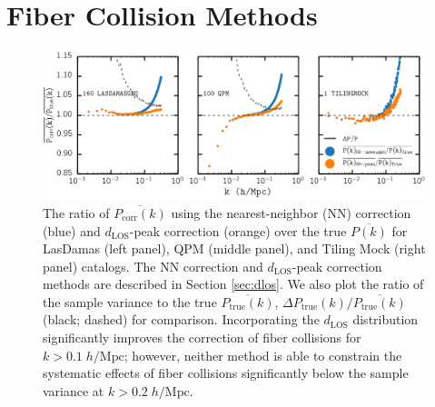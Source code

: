 \documentclass{emulateapj}
\begin{document}
\section{Fiber Collision Methods} \label{sec:fc_corr}
\begin{figure}
\begin{center}
\includegraphics[scale=0.55]{fcpaper_pk_peakonly_comp.png} 
\caption{The ratio of $\overline{P_\mathrm{corr} (k)}$ using the nearest-neighbor (NN) correction (blue) and $d_\mathrm{LOS}$-peak correction (orange) over the true $\overline{P(k)}$ for LasDamas (left panel), QPM (middle panel), and Tiling Mock (right panel) catalogs. The NN correction and $d_\mathrm{LOS}$-peak correction methods are described in Section \ref{sec:dlos}. We also plot the ratio of the sample variance to the true $\overline{P_\mathrm{true}(k)}$, $\Delta P_\mathrm{true}(k) / \overline{P_\mathrm{true}(k)}$ (black; dashed) for comparison. Incorporating the $d_{\mathrm{LOS}}$ distribution significantly improves the correction of fiber collisions for $k > 0.1 \; h/\mathrm{Mpc}$; however, neither method is able to constrain the systematic effects of fiber collisions significantly below the sample variance at $k > 0.2 \; h/\mathrm{Mpc}$.}\label{fig:fc_pk}
\end{center}
\end{figure}
\end{document}
